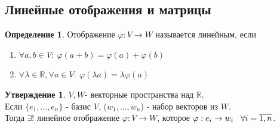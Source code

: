 \documentclass[a4paper, 12pt]{article}
\newcommand{\R}{\mathbb R}
\renewcommand{\phi}{\varphi}
\newcommand\tab[1][.5cm]{\hspace*{#1}}
\theoremstyle{definition}
\newtheorem*{definition}{Определение}
\newtheorem*{subtheorem}{Утверждение}
\begin{document}
  \subsection{Линейные отображения и матрицы}
  \begin{definition}
    Отображение $\phi: V \to W$ называется линейным, если
    \begin{enumerate}
      \item $\forall a,b \in V: \ \phi(a+b) = \phi(a) + \phi(b)$
      \item $\forall \lambda \in \R, \forall a \in V: \  \phi(\lambda a) = \lambda \phi(a)$  
    \end{enumerate}
    
  \end{definition} 
  \begin{subtheorem}
    $V,W$- векторные пространства над $\R$. \\
      Если $\{e_1,...,e_n\}$ - базис $V$, ($w_1,...,w_n$) - набор векторов из $W$. \\Тогда $\exists$! линейное отображение $\phi: V \to W$, которое $\phi: e_i \to w_i \tab[0.3cm]\forall i = \overline{1,n}$.
  \end{subtheorem} 
\end{document}
